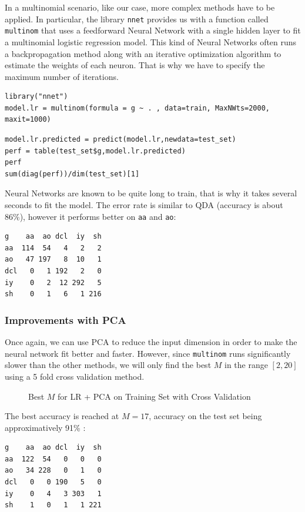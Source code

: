 \documentclass[]{report}
\newcommand{\inputtikz}[2]{%
	\scalebox{#1}{}  
}
\begin{document}
In a multinomial scenario, like our case, more complex methods have to be applied. In particular, the library \texttt{nnet} provides us with a function called \texttt{multinom} that uses a feedforward Neural Network with a single hidden layer to fit a multinomial logistic regression model. This kind of Neural Networks often runs a backpropagation method along with an iterative optimization algorithm to estimate the weights of each neuron. That is why we have to specify the maximum number of iterations.

\begin{lstlisting}
library("nnet")
model.lr = multinom(formula = g ~ . , data=train, MaxNWts=2000, maxit=1000)
\end{lstlisting}

\begin{lstlisting}
model.lr.predicted = predict(model.lr,newdata=test_set)
perf = table(test_set$g,model.lr.predicted)
perf
sum(diag(perf))/dim(test_set)[1]
\end{lstlisting}

Neural Networks are known to be quite long to train, that is why it takes several seconds to fit the model. The error rate is similar to QDA (accuracy is about 86\%), however it performs better on \texttt{aa} and \texttt{ao}: 
\begin{verbatim}
g    aa  ao dcl  iy  sh
aa  114  54   4   2   2
ao   47 197   8  10   1
dcl   0   1 192   2   0
iy    0   2  12 292   5
sh    0   1   6   1 216
\end{verbatim}

\subsubsection{Improvements with PCA}
Once again, we can use PCA to reduce the input dimension in order to make the neural network fit better and faster. However, since \texttt{multinom} runs significantly slower than the other methods, we will only find the best $M$ in the range $[2, 20]$ using a 5 fold cross validation method.

\begin{figure}[!hb]
	\centering
	\inputtikz{0.5}{Figures/lr_pca_cv.tex}
	\caption{Best $M$ for LR + PCA on Training Set with Cross Validation}
	\label{fig:lr_pca_cv}
\end{figure}

The best accuracy is reached at $M = 17$, accuracy on the test set being approximatively 91\% : 
\begin{verbatim}
g    aa  ao dcl  iy  sh
aa  122  54   0   0   0
ao   34 228   0   1   0
dcl   0   0 190   5   0
iy    0   4   3 303   1
sh    1   0   1   1 221
\end{verbatim}
\end{document}
